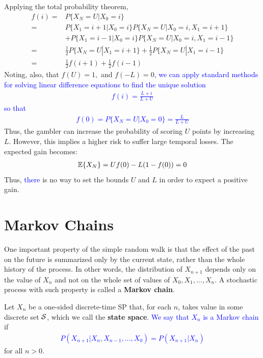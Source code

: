 Applying the total probability theorem,
\begin{align}
f(i) =& P\{X_N = U | X_0 = i\}  \nonumber \\
     =& P\{X_1 = i+1 | X_0 = i\} P\{X_N = U | X_0 = i, X_1 = i+1\}   \nonumber \\
      &+ P\{X_1 = i-1 | X_0 = i\} P\{X_N = U | X_0 = i, X_1 = i-1\}   \nonumber\\
     =& \frac12 P\{X_N = U | X_1 = i+1\} + \frac12 P\{X_N = U | X_1 = i-1\} \nonumber\\
     =& \frac12 f (i+1) + \frac12 f(i-1)
\end{align}
Noting, also, that $f(U)=1,$ and $f(-L) = 0$, \textcolor{blue}{we can apply standard methods for solving linear difference equations to find the unique solution
\begin{align}
f(i) = \frac{L+i}{L+U}
\end{align}
so that
\begin{align}
f(0) = P\{X_N = U | X_0 = 0\} = \frac{L}{L+U}
\end{align}}
Thus, the gambler can increase the probability of scoring $U$ points by increasing $L$. However, this implies a higher risk to suffer large temporal losses. The expected gain becomes:
\begin{align}
\mathbb{E}\{X_N\} = U f(0) - L (1-f(0)) = 0
\end{align}
Thus, \textcolor{blue}{there} is no way to set the bounds $U$ and $L$ in order to expect a positive gain.



\section{Markov Chains}

One important property of the simple random walk is that the effect of the past on the future is summarized only by the current state, rather than the whole history of the process. In other words, the distribution of $X_{n+1}$ depends only on the value of $X_n$ and not on the whole set of values of $X_0, X_1, \ldots, X_n$. A stochastic process with such property is called a \textbf{Markov chain}.

\begin{definition}
Let $X_n$ be a one-sided discrete-time SP that, for each $n$, takes value in some discrete set ${\cal S}$, which we call  the \textbf{state space}. \textcolor{blue}{We say that $X_n$ is a Markov chain} if
\textcolor{blue}{\begin{align}
P(X_{n+1} | X_n, X_{n-1}, \ldots, X_0) = P(X_{n+1} | X_n)
\label{SP:markov_chain}
\end{align}}
for all $n > 0$. 

\end{definition}

